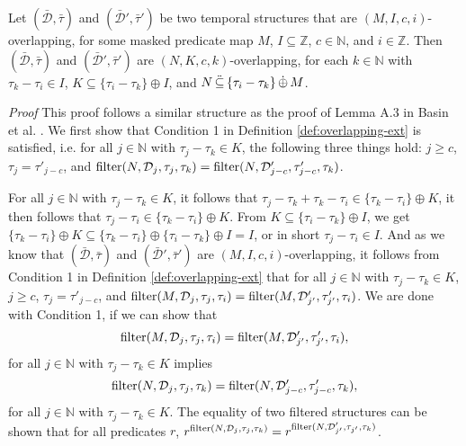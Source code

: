 \begin{lemma}
    \label{lem:eri-overlap-transitivity}
    Let $(\bar{\mathcal{D}}, \bar{\tau})$
        and
        $(\bar{\mathcal{D}}', \bar{\tau}')$ be two temporal structures that are $(M,I,c,i)$-overlapping,
            for some masked predicate map $M$,
            $I \subseteq \mathbb{Z}$,
            $c \in \mathbb{N}$,
            and $i \in \mathbb{Z}$.
    Then $(\bar{\mathcal{D}}, \bar{\tau})$ and $(\bar{\mathcal{D}}', \bar{\tau}')$
    are $(N, K, c, k)$-overlapping,
        for each $k \in \mathbb{N}$
        with $\tau_k - \tau_i \in I$, $K \subseteq \{ \tau_i - \tau_k \} \oplus I$,
        and $N \,\ddot{\subseteq}\, \{ \tau_i - \tau_k \} \,\dot{\oplus}\, M$.
\end{lemma}
\textit{Proof} 
This proof follows a similar structure as the proof of Lemma A.3 in Basin et al. \cite{Basin2016}.
We first show that Condition 1 in Definition \ref{def:overlapping-ext} is satisfied, i.e.
for all $j \in \mathbb{N}$ with $\tau_j - \tau_k \in K$,
the following three things hold:
$j \geq c$,
$\tau_j = \tau'_{j-c}$,
and
$ \operatorname{filter}(N, \mathcal{D}_j, \tau_j, \tau_k) = \operatorname{filter}(N, \mathcal{D}'_{j-c}, \tau'_{j-c}, \tau_k)$.

For all $j \in \mathbb{N}$ with $\tau_j - \tau_k \in K$,
    it follows that $\tau_j - \tau_k + \tau_k - \tau_i \in \{\tau_k - \tau_i \} \oplus K$,
    it then follows that $\tau_j - \tau_i \in \{\tau_k - \tau_i\} \oplus K$. 
From $K \subseteq \{ \tau_i - \tau_k \} \oplus I$,
    we get $\{\tau_k - \tau_i\} \oplus K \subseteq \{\tau_k - \tau_i \} \oplus \{\tau_i - \tau_k \} \oplus I = I$,
    or in short $\tau_j - \tau_i \in I$.
And as we know that $(\bar{\mathcal{D}}, \bar{\tau})$
    and $(\bar{\mathcal{D}}', \bar{\tau}')$ are $(M,I,c,i)$-overlapping,
    it follows from Condition 1 in Definition \ref{def:overlapping-ext} that
    for all $j \in \mathbb{N}$ with $\tau_j - \tau_k \in K$,
    $j \geq c$, $\tau_j = \tau'_{j-c}$,
    and $\operatorname{filter}(M, \mathcal{D}_j, \tau_j, \tau_i) = \operatorname{filter}(M, \mathcal{D}'_{j'}, \tau'_{j'}, \tau_i)$.
We are done with Condition 1, if we can show that
\begin{equation*}
    \operatorname{filter}(M, \mathcal{D}_j, \tau_j, \tau_i) = \operatorname{filter}(M, \mathcal{D}'_{j'}, \tau'_{j'}, \tau_i),
\end{equation*}
for all $j \in \mathbb{N}$ with $\tau_j - \tau_k \in K$ implies 
\begin{equation*}
    \operatorname{filter}(N, \mathcal{D}_j, \tau_j, \tau_k) 
    = \operatorname{filter}(N, \mathcal{D}'_{j-c}, \tau'_{j-c}, \tau_k),  
\end{equation*}
for all $j \in \mathbb{N}$ with $\tau_j - \tau_k \in K$.
The equality of two filtered structures can be shown that for all predicates $r$,
$r^{\operatorname{filter}(N, \mathcal{D}_j, \tau_j, \tau_k)} = r^{\operatorname{filter}(N, \mathcal{D}'_{j'}, \tau_{j'}, \tau_k)}$.

